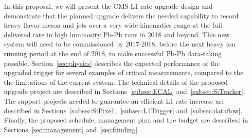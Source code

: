 In this proposal, we will present the CMS L1 rate upgrade design and demonstrate that the planned upgrade delivers the needed capability to record heavy flavor meson and jets over a very wide kinematics range at the full delivered rate in high luminosity Pb-Pb runs in 2018 and beyond. This new system will need to be commissioned by 2017-2018, before the next heavy ion running period at the end of 2018, to make successful Pb-Pb data-taking possible. Section~\ref{sec:physics} describes the expected performance of the upgraded trigger for several examples of critical measurements, compared to the the limitations of the current system. The technical details of the proposed upgrade project are described in Sections~\ref{subsec:ECAL} and~\ref{subsec:SiTracker}. The support projects needed to guarantee an efficient L1 rate increase are described in Sections~\ref{subsec:SiPixel},~\ref{subsec:L1Trigger} and~\ref{subsec:dataflow}. Finally, the proposed schedule, management plan and the budget are described in Sections~\ref{sec:management} and~\ref{sec:funding}.

